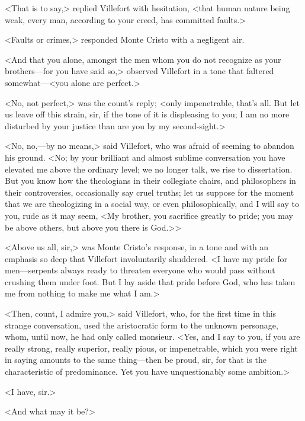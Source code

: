  <That is to say,> replied Villefort with hesitation, <that human nature being weak, every man, according to your creed, has committed faults.> 

 <Faults or crimes,> responded Monte Cristo with a negligent air. 

 <And that you alone, amongst the men whom you do not recognize as your brothers—for you have said so,> observed Villefort in a tone that faltered somewhat—<you alone are perfect.> 

 <No, not perfect,> was the count's reply; <only impenetrable, that's all. But let us leave off this strain, sir, if the tone of it is displeasing to you; I am no more disturbed by your justice than are you by my second-sight.> 

 <No, no,—by no means,> said Villefort, who was afraid of seeming to abandon his ground. <No; by your brilliant and almost sublime conversation you have elevated me above the ordinary level; we no longer talk, we rise to dissertation. But you know how the theologians in their collegiate chairs, and philosophers in their controversies, occasionally say cruel truths; let us suppose for the moment that we are theologizing in a social way, or even philosophically, and I will say to you, rude as it may seem, <My brother, you sacrifice greatly to pride; you may be above others, but above you there is God.>>

<Above us all, sir,> was Monte Cristo's response, in a tone and with an emphasis so deep that Villefort involuntarily shuddered. <I have my pride for men—serpents always ready to threaten everyone who would pass without crushing them under foot. But I lay aside that pride before God, who has taken me from nothing to make me what I am.> 

 <Then, count, I admire you,> said Villefort, who, for the first time in this strange conversation, used the aristocratic form to the unknown personage, whom, until now, he had only called monsieur. <Yes, and I say to you, if you are really strong, really superior, really pious, or impenetrable, which you were right in saying amounts to the same thing—then be proud, sir, for that is the characteristic of predominance. Yet you have unquestionably some ambition.> 

 <I have, sir.> 

 <And what may it be?> 

